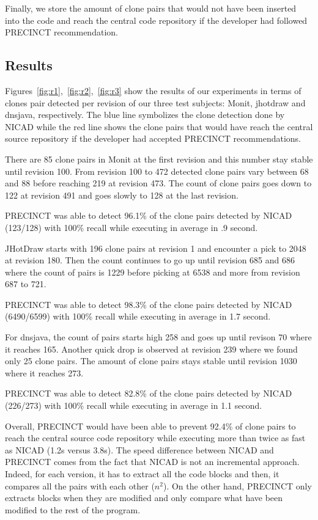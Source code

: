 \documentclass[conference]{IEEEtran}
\begin{document}
Finally, we store the amount of clone pairs that would not have been inserted into the code and reach the central code repository if the developer had followed PRECINCT recommendation.



\subsection{Results}
\label{sub:Results}

Figures~\ref{fig:r1},~\ref{fig:r2},~\ref{fig:r3} show the results of our experiments in terms of clones pair detected per revision of our three test subjects: Monit, jhotdraw and dnsjava, respectively.
The blue line symbolizes the clone detection done by NICAD while the red line shows the clone pairs that would have reach the central source repository if the developer had accepted PRECINCT recommendations.

There are 85 clone pairs in Monit at the first revision and this number stay stable until revision 100.
From revision 100 to 472 detected clone pairs vary between 68 and 88 before reaching 219 at revision 473.
The count of clone pairs goes down to 122 at revision 491 and goes slowly to 128 at the last revision.

PRECINCT was able to detect 96.1\% of the clone pairs detected by NICAD (123/128) with 100\% recall while executing in average in .9 second.

JHotDraw starts with 196 clone pairs at revision 1 and encounter a pick to 2048 at revision 180.
Then the count continues to go up until revision 685 and 686 where the count of pairs is 1229 before picking at 6538 and more from revision 687 to 721.

PRECINCT was able to detect 98.3\% of the clone pairs detected by NICAD (6490/6599) with 100\% recall while executing in average in 1.7 second.

For dnsjava, the count of pairs starts high 258 and goes up until revison 70 where it reaches 165.
Another quick drop is observed at revision 239 where we found only 25 clone pairs.
The amount of clone pairs stays stable until revision 1030 where it reaches 273.

PRECINCT was able to detect 82.8\% of the clone pairs detected by NICAD (226/273) with 100\% recall while executing in average in 1.1 second.

Overall, PRECINCT would have been able to prevent 92.4\% of clone pairs to reach the central source code repository while executing more than twice as fast as NICAD (1.2s versus 3.8s).
The speed difference between NICAD and PRECINCT comes from the fact that NICAD is not an incremental approach.
Indeed, for each version, it has to extract all the code blocks and then, it compares all the pairs with each other ($n^2$).
On the other hand, PRECINCT only extracts blocks when they are modified and only compare what have been modified to the rest of the program.
\end{document}
